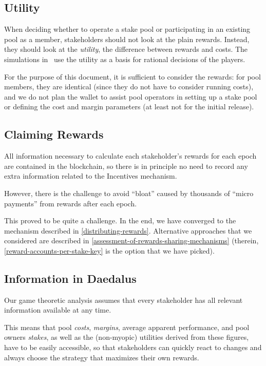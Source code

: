 \documentclass[11pt,a4paper,dvipsnames,twosided]{article}
\newcommand{\citep}[1]{\cite{#1}}
\begin{document}
\subsection{Utility}
\label{utility}

When deciding whether to operate a stake pool or participating in an existing
pool as a member, stakeholders should not look at the plain rewards. Instead,
they should look at the \emph{utility}, the difference between rewards and
costs. The simulations in~\citep{bkks2018} use the utility as a basis for
rational decisions of the players.

For the purpose of this document, it is sufficient to consider the rewards: for
pool members, they are identical (since they do not have to consider running
costs), and we do not plan the wallet to assist pool operators in setting up a
stake pool or defining the cost and margin parameters (at least not for the
initial release).

\subsection{Claiming Rewards}
\label{claiming-rewards}

All information necessary to calculate each stakeholder's rewards for
each epoch are contained in the blockchain, so there is in principle no
need to record any extra information related to the Incentives
mechanism.

However, there is the challenge to avoid ``bloat'' caused by thousands
of ``micro payments'' from rewards after each epoch.

This proved to be quite a challenge. In the end, we have converged to the
mechanism described in \cref{distributing-rewards}. Alternative approaches that
we considered are described in \cref{assessment-of-rewards-sharing-mechanisms}
(therein, \cref{reward-accounts-per-stake-key} is the option that we have
picked).

\subsection{Information in Daedalus}
\label{information-in-daedalus}

Our game theoretic analysis assumes that every stakeholder has all
relevant information available at any time.

This means that pool \emph{costs}, \emph{margins}, average apparent performance,
and pool owners \emph{stakes}, as well as the (non-myopic) utilities derived
from these figures, have to be easily accessible, so that stakeholders can
quickly react to changes and always choose the strategy that maximizes their own
rewards.
\end{document}
